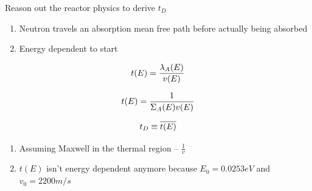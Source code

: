 \documentclass[aspectratio=1610,pdftex,dvipsnames,compress,xcolor={dvipsnames}]{beamer}
\begin{document}
\begin{frame}{Reason out the reactor physics to derive $t_D$}
    \begin{enumerate}[series=outerlist,topsep=0pt,itemsep=21pt,leftmargin=*,label=(\arabic*)]
        \item[]Neutron travels an absorption mean free path before actually being absorbed
        \item[]Energy dependent to start
    \end{enumerate}

    \vspace*{\fill}

    \begin{equation}
        \LARGE
        t(E) = \frac{\lambda_A(E)}{v(E)}
    \end{equation}

    \begin{equation}
        \LARGE
        t(E) = \frac{1}{\Sigma_A(E)v(E)}
    \end{equation}

    \begin{equation}
        \LARGE
        t_D \equiv \overline{t(E)}
    \end{equation}

    \vspace*{\fill}

    \begin{enumerate}[series=outerlist,topsep=0pt,itemsep=21pt,leftmargin=*,label=(\arabic*)]
        \item[]Assuming Maxwell in the thermal region -- $\frac{1}{v}$
        \item[]$t(E)$ isn't energy dependent anymore because $E_0 = 0.0253 eV$ and $v_0 = 2200 m/s$
    \end{enumerate}
\end{frame}
\end{document}
